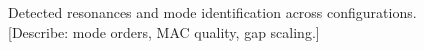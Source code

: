 \begin{figure}[htb]
  \centering
  \caption{Detected resonances and mode identification across
    configurations. [Describe: mode orders, MAC quality, gap scaling.]}
  \label{fig:res:modes}
\end{figure}

